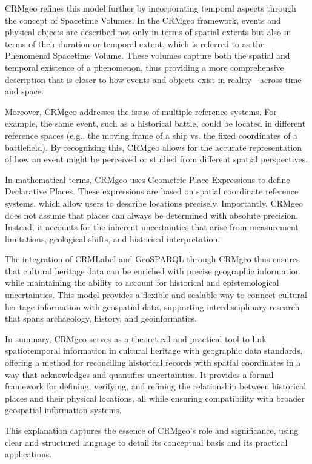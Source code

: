 CRMgeo refines this model further by incorporating temporal aspects through the concept of Spacetime Volumes. In the CRMgeo framework, events and physical objects are described not only in terms of spatial extents but also in terms of their duration or temporal extent, which is referred to as the Phenomenal Spacetime Volume. These volumes capture both the spatial and temporal existence of a phenomenon, thus providing a more comprehensive description that is closer to how events and objects exist in reality—across time and space.

Moreover, CRMgeo addresses the issue of multiple reference systems. For example, the same event, such as a historical battle, could be located in different reference spaces (e.g., the moving frame of a ship vs. the fixed coordinates of a battlefield). By recognizing this, CRMgeo allows for the accurate representation of how an event might be perceived or studied from different spatial perspectives.

In mathematical terms, CRMgeo uses Geometric Place Expressions to define Declarative Places. These expressions are based on spatial coordinate reference systems, which allow users to describe locations precisely. Importantly, CRMgeo does not assume that places can always be determined with absolute precision. Instead, it accounts for the inherent uncertainties that arise from measurement limitations, geological shifts, and historical interpretation.

The integration of \acrshort{CRMLabel} and GeoSPARQL through CRMgeo thus ensures that cultural heritage data can be enriched with precise geographic information while maintaining the ability to account for historical and epistemological uncertainties. This model provides a flexible and scalable way to connect cultural heritage information with geospatial data, supporting interdisciplinary research that spans archaeology, history, and geoinformatics.

In summary, CRMgeo serves as a theoretical and practical tool to link spatiotemporal information in cultural heritage with geographic data standards, offering a method for reconciling historical records with spatial coordinates in a way that acknowledges and quantifies uncertainties. It provides a formal framework for defining, verifying, and refining the relationship between historical places and their physical locations, all while ensuring compatibility with broader geospatial information systems.

This explanation captures the essence of CRMgeo's role and significance, using clear and structured language to detail its conceptual basis and its practical applications.


